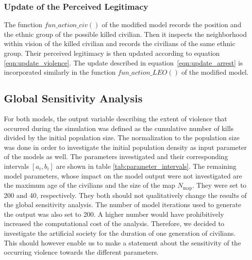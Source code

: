 \documentclass[11pt]{article}
\begin{document}
\subsubsection{Update of the Perceived Legitimacy}
The function $fun\_action\_civ()$ of the modified model records the position and the ethnic group of the possible killed civilian. Then it inspects the neighborhood within vision of the killed civilian and records the civilians of the same ethnic group. Their perceived legitimacy is then updated according to equation \eqref{eqn:update_violence}. The update described in equation~\eqref{eqn:update_arrest} is incorporated similarly in the function $fun\_action\_LEO()$ of the modified model.

\subsection{Global Sensitivity Analysis}
\label{sec:imp_SA}
For both models, the output variable describing the extent of violence that occurred during the simulation was defined as the cumulative number of kills divided by the initial population size. The normalization to the population size was done in order to investigate the initial population density as input parameter of the models as well. The parameters investigated and their corresponding intervals $[a_i,b_i]$ are shown in table \ref{tab:parameter_intervals}. The remaining model parameters, whose impact on the model output were not investigated are the maximum age of the civilians and the size of the map $N_{\text{map}}$. They were set to 200 and 40, respectively. They both should not qualitatively change the results of the global sensitivity analysis. The number of model iterations used to generate the output was also set to 200. A higher number would have prohibitively increased the computational cost of the analysis. Therefore, we decided to investigate the artificial society for the duration of one generation of civilians. This should however enable us to make a statement about the sensitivity of the occurring violence towards the different parameters.\\
\\
\end{document}
